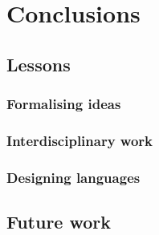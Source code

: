 \chapter{Conclusions}

\section{Lessons}

\subsection{Formalising ideas}

\subsection{Interdisciplinary work}

\subsection{Designing languages}

\section{Future work}
